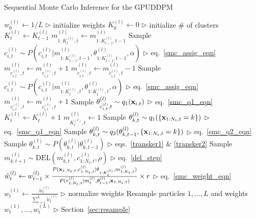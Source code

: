 \documentclass[smallcondensed, final]{svjour3}
\begin{document}
\begin{algorithm}[!]
\caption{Sequential Monte Carlo Inference for the GPUDDPM}
\label{alg:SMC}
\begin{algorithmic}[1]
\STATE $w_{0}^{(l)} \leftarrow 1/L$ \hfill $\triangleright$ initialize weights
\ENDFOR
\STATE $K_{0}^{(l)} \leftarrow 0$ \hfill $\triangleright$ initialize \# of clusters
\STATE $K_{t}^{(l)}  \leftarrow K_{t-1}^{(l)}$
\STATE $m_{1:K_{t}^{(l)}, t}^{(l)} \leftarrow m_{1:K_{t-1}^{(l)}, t-1}^{(l)}$
\STATE Sample $c_{i,t}^{(l)} \sim P \left( c_{i,t}^{(l)} | m_{1:K_{t-1}^{(l)}, t-1}^{(l)}, \theta_{1:K_{t-1}^{(l)}, t-1}^{(l)}, \alpha \right)$  \hfill $\triangleright$ eq.~\eqref{smc_assig_eqn}
\STATE $m_{c_{i,t}^{(l)},t}^{(l)} \leftarrow m_{c_{i,t}^{(l)},t}^{(l)} + 1$
\ELSE
\STATE $m_{c_{i,t}^{(l)},t}^{(l)} \leftarrow m_{c_{i,t}^{(l)},t}^{(l)} - 1$
\STATE Sample $c_{i,t}^{(l)} \sim P \left( c_{i,t}^{(l)} | m_{1:K_{t}^{(l)}, t}^{(l)}, \theta_{1:K_{t}^{(l)}, t}^{(l)}, \alpha \right)$  \hfill $\triangleright$ eq.~\eqref{smc_assig_eqn}
\STATE $m_{c_{i,t}^{(l)},t}^{(l)} \leftarrow m_{c_{i,t}^{(l)},t}^{(l)} + 1$
\ENDIF
{}
\STATE Sample $\theta_{c_{i,t}^{(l)}, t}^{(l)} \sim q_{1}(\bold{x}_{i,t})$ \hfill $\triangleright$ eq.~\eqref{smc_q1_eqn}
\STATE $K_{t}^{(l)} \leftarrow K_{t}^{(l)} + 1$
\STATE $m_{K_{t}^{(l)},t}^{(l)} \leftarrow 1$
\ENDIF
\ENDFOR
{}
\STATE Sample $\theta_{k,t}^{(l)} \sim q_{1}(\{ \bold{x}_{1:N_{t}, t} = k \})$  \hfill $\triangleright$ eq.~\eqref{smc_q1_eqn}
\STATE Sample $\theta_{k,t}^{(l)} \sim q_{2}(\theta_{k,t-1}^{(l)}, \{ \bold{x}_{1:N_{t}, t} = k \})$  \hfill $\triangleright$ eq.~\eqref{smc_q2_eqn}
\STATE Sample $\theta_{k,t}^{(l)} \sim P(\theta_{k,t}^{(l)} | \theta_{k,t-1}^{(l)})$  \hfill $\triangleright$ eqs.~\eqref{transker1} $\&$ \eqref{transker2}
\ENDIF
{}
\STATE Sample $m_{k,t+1}^{(l)} \sim \text{DEL}(m_{k,t}^{(l)}, c_{1:N_{t}, t}^{(l)}, \rho)$  \hfill $\triangleright$ eq.~\eqref{del_step}
\ENDIF
\ENDFOR
\ENDFOR
\STATE $\tilde{w}_{t}^{(l)} \leftarrow w_{t-1}^{(l)} \times \frac{ P(\bold{x}_{1:N_{t},t}, c_{1:N_{t}, t}^{(l)} | \theta_{1:K_{t}^{(l)}}, m_{1:K_{t},t}^{(l)})}	{P(c_{1:N_{t}, t}^{(l)} | m_{t}^{(l)}, \theta_{t-1}^{(l)}, \bold{x}_{1:N_{t},t} ) } \times r $  \hfill $\triangleright$ eq.~\eqref{smc_weight_eqn}
\ENDFOR
{}
\STATE $w_{t}^{(l)} \leftarrow \frac{\tilde{w}_{t}^{(l)}}{\sum_{l=1}^{L} \tilde{w}_{t}^{(l)} }$   \hfill $\triangleright$ normalize weights
\ENDFOR
\STATE Resample particles $1, \ldots, L$ and weights $w_{t}^{(1)}, \ldots, w_{t}^{(L)}$   \hfill $\triangleright$ Section~\ref{sec:resample}
\ENDFOR
\end{algorithmic}
\end{algorithm}
\end{document}
